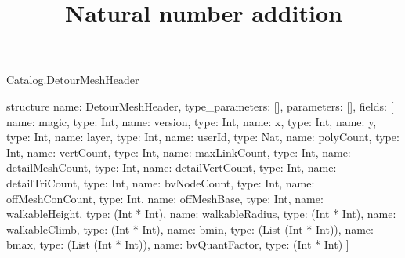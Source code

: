 \begin{lexlean}{Catalog.DetourMeshHeader}
\title{Natural number addition}
\begin{semanticmodule}
structure{
  name: DetourMeshHeader,
  type_parameters: [],
  parameters: [],
  fields: [
    {name: magic, type: Int},
    {name: version, type: Int},
    {name: x, type: Int},
    {name: y, type: Int},
    {name: layer, type: Int},
    {name: userId, type: Nat},
    {name: polyCount, type: Int},
    {name: vertCount, type: Int},
    {name: maxLinkCount, type: Int},
    {name: detailMeshCount, type: Int},
    {name: detailVertCount, type: Int},
    {name: detailTriCount, type: Int},
    {name: bvNodeCount, type: Int},
    {name: offMeshConCount, type: Int},
    {name: offMeshBase, type: Int},
    {name: walkableHeight, type: (Int * Int)},
    {name: walkableRadius, type: (Int * Int)},
    {name: walkableClimb, type: (Int * Int)},
    {name: bmin, type: (List (Int * Int))},
    {name: bmax, type: (List (Int * Int))},
    {name: bvQuantFactor, type: (Int * Int)}
  ]
}
\end{semanticmodule}
\end{lexlean}
